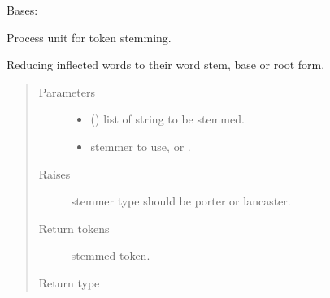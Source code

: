 \documentclass[letterpaper,10pt,english]{sphinxmanual}
\begin{document}
\begin{fulllineitems}
\label{\detokenize{matchzoo:matchzoo.preprocessors.StemmingUnit}}
Bases: {\hyperref[\detokenize{matchzoo:matchzoo.preprocessors.ProcessorUnit}]{}}

Process unit for token stemming.

\begin{fulllineitems}
\label{\detokenize{matchzoo:matchzoo.preprocessors.StemmingUnit.transform}}
Reducing inflected words to their word stem, base or root form.
\begin{quote}\begin{description}
\item[{Parameters}] \leavevmode\begin{itemize}
\item {} 
 () \textendash{} list of string to be stemmed.

\item {} 
 \textendash{} stemmer to use,  or .

\end{itemize}

\item[{Raises}] \leavevmode
{} \textendash{} stemmer type should be porter or lancaster.

\item[{Return tokens}] \leavevmode
stemmed token.

\item[{Return type}] \leavevmode
{}

\end{description}\end{quote}

\end{fulllineitems}


\end{fulllineitems}
\end{document}

